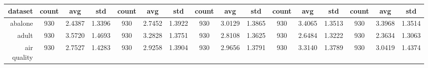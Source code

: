 \begin{table}[htbp]
{\begin{tabular}{rccccccccccccccc}
			\cmidrule{2-16}    \textbf{dataset} & \textbf{count}                          & \textbf{avg}                                                                       & \textbf{std}    & \textbf{count}                  & \textbf{avg}                                                              & \textbf{std}    & \textbf{count}                  & \textbf{avg}    & \textbf{std}    & \textbf{count}                  & \textbf{avg}                                                              & \textbf{std}    & \textbf{count}                  & \textbf{avg}                                                              & \textbf{std}    \\
			\midrule
			abalone                             & 930                                     & \cellcolor[rgb]{ .776,  .937,  .808}\textcolor[rgb]{ 0,  .38,  0}{2.4387}          & 1.3396          & 930                             & 2.7452                                                                    & 1.3922          & 930                             & 3.0129          & 1.3865          & 930                             & 3.4065                                                                    & 1.3513          & 930                             & 3.3968                                                                    & 1.3514          \\
			adult                               & 930                                     & 3.5720                                                                             & 1.4693          & 930                             & 3.2828                                                                    & 1.3751          & 930                             & 2.8108          & 1.3625          & 930                             & 2.6484                                                                    & 1.3222          & 930                             & \cellcolor[rgb]{ .776,  .937,  .808}\textcolor[rgb]{ 0,  .38,  0}{2.3634} & 1.3063          \\
			air quality                         & 930                                     & \cellcolor[rgb]{ .776,  .937,  .808}\textcolor[rgb]{ 0,  .38,  0}{2.7527}          & 1.4283          & 930                             & 2.9258                                                                    & 1.3904          & 930                             & 2.9656          & 1.3791          & 930                             & 3.3140                                                                    & 1.3789          & 930                             & 3.0419                                                                    & 1.4374          \\

\end{tabular}}
\end{table}

